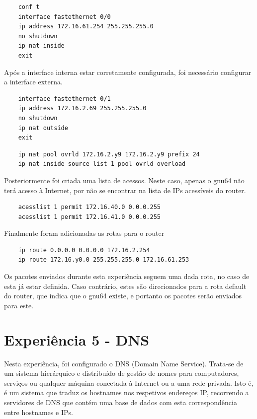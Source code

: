 \documentclass[article, a4paper, 11pt, oneside]{memoir}
\begin{document}
\begin{lstlisting}
	conf t 
	interface fastethernet 0/0
	ip address 172.16.61.254 255.255.255.0 
	no shutdown 
	ip nat inside 
	exit 
\end{lstlisting} 

Após a interface interna estar corretamente configurada, foi necessário configurar a interface externa.

\begin{lstlisting}
	interface fastethernet 0/1
	ip address 172.16.2.69 255.255.255.0 
	no shutdown 
	ip nat outside 
	exit 
\end{lstlisting} 

\begin{lstlisting}
	ip nat pool ovrld 172.16.2.y9 172.16.2.y9 prefix 24 
	ip nat inside source list 1 pool ovrld overload 
\end{lstlisting}

Posteriormente foi criada uma lista de acessos. Neste caso, apenas o gnu64 não terá acesso à Internet, por não se encontrar na lista de IPs acessíveis do router.

\begin{lstlisting}
	acesslist 1 permit 172.16.40.0 0.0.0.255
	acesslist 1 permit 172.16.41.0 0.0.0.255
\end{lstlisting}

Finalmente foram adicionadas as rotas para o router
\begin{lstlisting}
	ip route 0.0.0.0 0.0.0.0 172.16.2.254 
	ip route 172.16.y0.0 255.255.255.0 172.16.61.253
\end{lstlisting}

Os pacotes enviados durante esta experiência seguem uma dada rota, no caso de esta já estar definida. Caso contrário, estes são direcionados para a rota default do router,
que indica que o gnu64 existe, e portanto os pacotes serão enviados para este.

\section{Experiência 5 - DNS}			

Nesta experiência, foi configurado o DNS (Domain Name Service). Trata-se de um sistema hierárquico e distribuído de gestão de nomes para computadores, serviços ou qualquer máquina conectada à
 Internet ou a uma rede privada.
Isto é, é um sistema que traduz os hostnames nos respetivos endereços IP, 
recorrendo a servidores de DNS que contém uma base de dados com esta correspondência entre hostnames e IPs.
\end{document}

